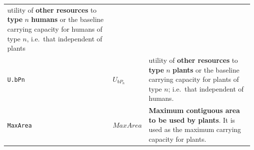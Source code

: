 \documentclass[]{book}
\begin{document}
\begin{longtable}[]{@{}lll@{}}
\begin{minipage}[t]{0.40\columnwidth}
utility of \textbf{other resources} to \textbf{type} \(n\) \textbf{humans} or the baseline carrying capacity for humans of type \(n\), i.e.~that independent of plants\strut
\end{minipage}\tabularnewline
\begin{minipage}[t]{0.27\columnwidth}\raggedright
\texttt{U.bPn}\strut
\end{minipage} & \begin{minipage}[t]{0.25\columnwidth}\raggedright
\(U_{bP_{n}}\)\strut
\end{minipage} & \begin{minipage}[t]{0.40\columnwidth}\raggedright
utility of \textbf{other resources} to \textbf{type} \(n\) \textbf{plants} or the baseline carrying capacity for plants of type \(n\); i.e.~that independent of humans.\strut
\end{minipage}\tabularnewline
\begin{minipage}[t]{0.27\columnwidth}\raggedright
\texttt{MaxArea}\strut
\end{minipage} & \begin{minipage}[t]{0.25\columnwidth}\raggedright
\(MaxArea\)\strut
\end{minipage} & \begin{minipage}[t]{0.40\columnwidth}\raggedright
\textbf{Maximum contiguous area to be used by plants}. It is used as the maximum carrying capacity for plants.\strut
\end{minipage}\tabularnewline
\bottomrule
\end{longtable}

\newpage
\end{document}
